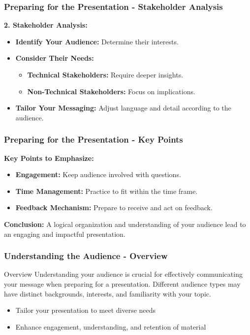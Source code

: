 \documentclass{beamer}
\begin{document}
\begin{frame}[fragile]
    \frametitle{Preparing for the Presentation - Stakeholder Analysis}
    \textbf{2. Stakeholder Analysis:}
    \begin{itemize}
        \item \textbf{Identify Your Audience:} Determine their interests.
        \item \textbf{Consider Their Needs:}
            \begin{itemize}
                \item \textbf{Technical Stakeholders:} Require deeper insights.
                \item \textbf{Non-Technical Stakeholders:} Focus on implications.
            \end{itemize}
        \item \textbf{Tailor Your Messaging:} Adjust language and detail according to the audience.
    \end{itemize}
\end{frame}

\begin{frame}[fragile]
    \frametitle{Preparing for the Presentation - Key Points}
    \textbf{Key Points to Emphasize:}
    \begin{itemize}
        \item \textbf{Engagement:} Keep audience involved with questions.
        \item \textbf{Time Management:} Practice to fit within the time frame.
        \item \textbf{Feedback Mechanism:} Prepare to receive and act on feedback.
    \end{itemize}
    
    \textbf{Conclusion:} A logical organization and understanding of your audience lead to an engaging and impactful presentation.
\end{frame}

\begin{frame}[fragile]
    \frametitle{Understanding the Audience - Overview}
    \begin{block}{Overview}
        Understanding your audience is crucial for effectively communicating your message when preparing for a presentation. Different audience types may have distinct backgrounds, interests, and familiarity with your topic.
    \end{block}
    \begin{itemize}
        \item Tailor your presentation to meet diverse needs
        \item Enhance engagement, understanding, and retention of material
    \end{itemize}
\end{frame}
\end{document}
